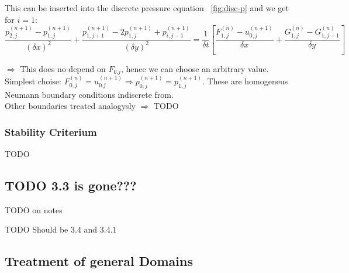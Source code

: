 This can be inserted into the discrete pressure equation ~\ref{fig:disc-p} and we get for $i = 1$:
\[ \frac{p_{2,j}^{(n+1)} - p_{1,j}^{(n+1)}}{(\delta x)^2} + \frac{p_{1,j+1}^{(n+1)} - 2 p_{1,j}^{(n+1)} + p_{i,j-1}^{(n+1)}}{(\delta y)^2} = \frac{1}{\delta t} \left[ \frac{F_{1,j}^{(n)} - u_{0,j}^{(n+1)}}{\delta x} + \frac{G_{1,j}^{(n)} - G_{1,j-1}^{(n)}}{\delta y}\right] \]

$\Rightarrow$ This does no depend on $F_{0.j}$, hence we can choose an arbitrary value. Simplest choise: $F_{0,j}^{(n)} = u_{0.j}^{(n+1)} \Rightarrow p_{0,j}^{(n+1)} = p_{1,j}^{(n+1)}$. These are homogeneus Neumann boundary conditions indiscrete from.\\

Other boundaries treated analogysly $\Rightarrow$
TODO



\subsubsection{Stability Criterium}
TODO 



\subsection{TODO 3.3 is gone???}



TODO on notes



TODO Should be 3.4 and 3.4.1
\subsection{Treatment of general Domains}

